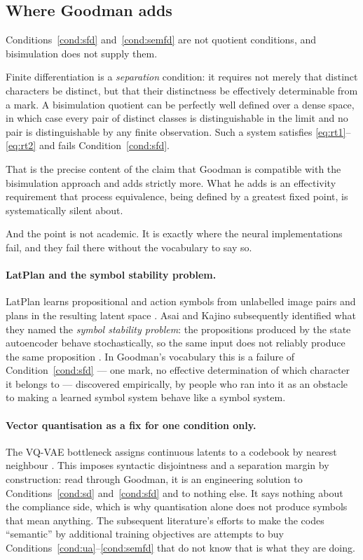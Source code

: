 \subsection{Where Goodman adds}
\label{sec:adds}

Conditions~\ref{cond:sfd} and~\ref{cond:semfd} are not quotient
conditions, and bisimulation does not supply them.

\begin{observation}
\label{obs:sep}
Finite differentiation is a \emph{separation} condition: it
requires not merely that distinct characters be distinct, but that
their distinctness be effectively determinable from a mark.
A bisimulation quotient can be perfectly well defined over a dense
space, in which case every pair of distinct classes is
distinguishable in the limit and no pair is distinguishable by any
finite observation.
Such a system satisfies \eqref{eq:rt1}--\eqref{eq:rt2} and fails
Condition~\ref{cond:sfd}.
\end{observation}

\noindent
That is the precise content of the claim that Goodman is compatible
with the bisimulation approach and adds strictly more.
What he adds is an effectivity requirement that process
equivalence, being defined by a greatest fixed point, is
systematically silent about.

And the point is not academic.
It is exactly where the neural implementations fail, and they fail
there without the vocabulary to say so.

\paragraph{LatPlan and the symbol stability problem.}
LatPlan learns propositional and action symbols from unlabelled
image pairs and plans in the resulting latent space
\cite{asai2018}.
Asai and Kajino subsequently identified what they named the
\emph{symbol stability problem}: the propositions produced by the
state autoencoder behave stochastically, so the same input does not
reliably produce the same proposition \cite{asai2019}.
In Goodman's vocabulary this is a failure of
Condition~\ref{cond:sfd} --- one mark, no effective determination
of which character it belongs to --- discovered empirically, by
people who ran into it as an obstacle to making a learned symbol
system behave like a symbol system.

\paragraph{Vector quantisation as a fix for one condition only.}
The VQ-VAE bottleneck assigns continuous latents to a codebook by
nearest neighbour \cite{oord2017}.
This imposes syntactic disjointness and a separation margin by
construction: read through Goodman, it is an engineering solution
to Conditions~\ref{cond:sd} and~\ref{cond:sfd} and to nothing else.
It says nothing about the compliance side, which is why
quantisation alone does not produce symbols that mean anything.
The subsequent literature's efforts to make the codes ``semantic''
by additional training objectives are attempts to buy
Conditions~\ref{cond:ua}--\ref{cond:semfd} that do not know that is
what they are doing.

